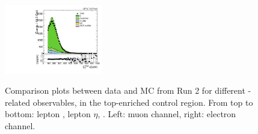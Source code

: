 \begin{figure}[htbp]
  \includegraphics[width=0.3825\textwidth]{fig/analysisAppendix/CR_b1_e_allP_allC_allD_Run2_met_pt.pdf}\\
  \caption{
    Comparison plots between data and MC from Run 2 for different \Wlep-related observables, in the top-enriched control region.
    From top to bottom: lepton \pt, lepton $\eta$, \ptmiss.
    Left: muon channel, right: electron channel.
  }
  \label{fig:CR_controlPlotsRun2_1}
\end{figure}

